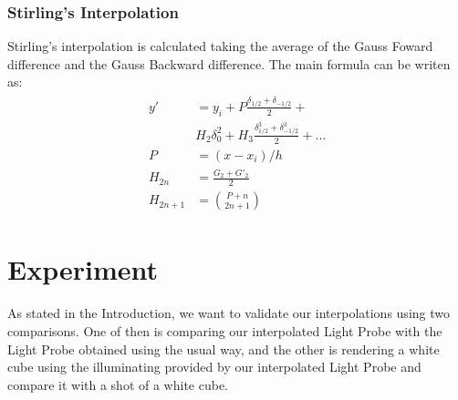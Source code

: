 \documentclass[conference]{acmsiggraph}
\begin{document}
\subsubsection{Stirling's Interpolation}
	Stirling's interpolation is calculated taking the average of the Gauss Foward difference and the Gauss Backward difference. The main formula
can be writen as:
\begin{align}
\begin{split}
	y' &= y_i + P \frac{\delta_{1/2}+\delta_{-1/2}}{2} + \\ &H_2 \delta_0^2 + H_3 \frac{\delta^3_{1/2}+\delta^3_{-1/2}}{2} + \dots\\
	P &= (x-x_i)/h \\
	H_{2n} &= \frac{G_2 + G'_2}{2} \\
	H_{2n+1} &= \binom{P+n}{2n+1}
\end{split}
\end{align}

\section{Experiment}
	As stated in the Introduction, we want to validate our interpolations using two comparisons. One of then is comparing our interpolated Light Probe
with the Light Probe obtained using the usual way, and the other is rendering a white cube using the illuminating provided by our interpolated Light Probe
and compare it with a shot of a white cube.
\end{document}
